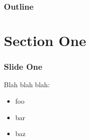 \documentclass[11pt,xcolor=dvipsnames]{beamer}
\begin{document}
{
  \pagestyle{empty}
\begin{frame}
  \titlepage
\end{frame}
}

\begin{frame}
  \frametitle{Outline}
  \tableofcontents
\end{frame}

\section{Section One}

\begin{frame}[fragile]
  \frametitle{Slide One}
  Blah blah blah:
  \begin{itemize}
  \item foo
  \item bar
  \item baz
  \end{itemize}
\end{frame}
\end{document}
